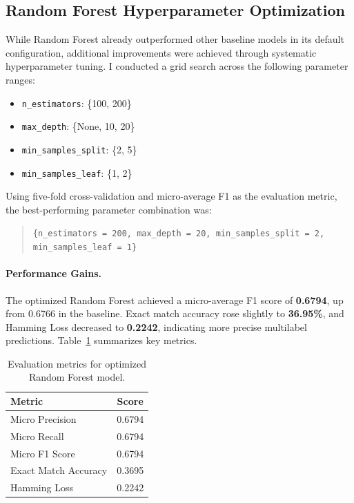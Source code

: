 \documentclass{article}
\begin{document}

\subsection{Random Forest Hyperparameter Optimization}

While Random Forest already outperformed other baseline models in its default configuration, additional improvements were achieved through systematic hyperparameter tuning. I conducted a grid search across the following parameter ranges:

\begin{itemize}
    \item \texttt{n\_estimators}: \{100, 200\}
    \item \texttt{max\_depth}: \{None, 10, 20\}
    \item \texttt{min\_samples\_split}: \{2, 5\}
    \item \texttt{min\_samples\_leaf}: \{1, 2\}
\end{itemize}

Using five-fold cross-validation and micro-average F1 as the evaluation metric, the best-performing parameter combination was:

\begin{quote}
\texttt{\{n\_estimators = 200, max\_depth = 20, min\_samples\_split = 2, min\_samples\_leaf = 1\}}
\end{quote}

\paragraph{Performance Gains.}
The optimized Random Forest achieved a micro-average F1 score of \textbf{0.6794}, up from 0.6766 in the baseline. Exact match accuracy rose slightly to \textbf{36.95\%}, and Hamming Loss decreased to \textbf{0.2242}, indicating more precise multilabel predictions. Table~\ref{tab:rf_tuned_performance} summarizes key metrics.

\begin{table}[H]
\centering
\begin{tabular}{|l|c|}
\hline
\textbf{Metric} & \textbf{Score} \\
\hline
Micro Precision & 0.6794 \\
Micro Recall    & 0.6794 \\
Micro F1 Score  & 0.6794 \\
Exact Match Accuracy & 0.3695 \\
Hamming Loss    & 0.2242 \\
\hline
\end{tabular}
\caption{Evaluation metrics for optimized Random Forest model.}
\label{tab:rf_tuned_performance}
\end{table}
\end{document}
